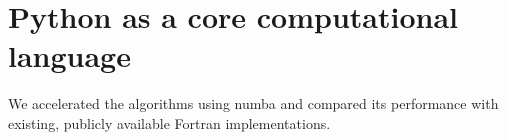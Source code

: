 \section{Python as a core computational language}

We accelerated the algorithms using numba and compared its performance with existing, publicly available Fortran implementations.
